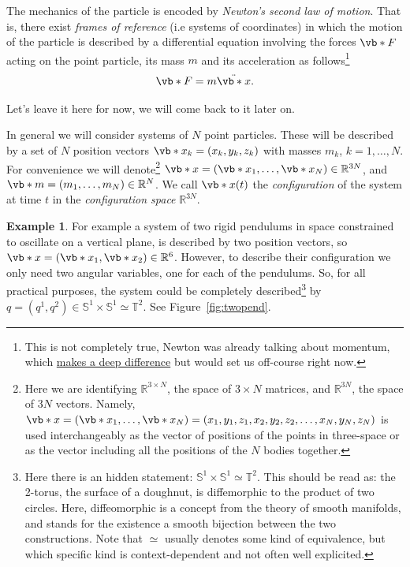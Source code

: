 \documentclass[english,fontsize=11pt,paper=b5]{scrbook}
\theoremstyle{definition}
\newtheorem{example}{Example}[chapter]
\begin{document}
  \begin{tcolorbox}
    The mechanics of the particle is encoded by \emph{Newton's second law of motion}.
    That is, there exist \emph{frames of reference} (i.e systems of coordinates) in which the motion of the particle is described by a differential equation involving the forces $\vb*{F}$ acting on the point particle, its mass $m$ and its acceleration as follows\footnote{This is not completely true, Newton was already talking about momentum, which \href{https://web.archive.org/web/20211201082909/https://bigthink.com/starts-with-a-bang/most-important-equation-physics/}{makes a deep difference} but would set us off-course right now.}
    \begin{equation}\label{eq:newton}
      \vb* F = m \ddot{\vb*{x}}.
    \end{equation}
  \end{tcolorbox}
  Let's leave it here for now, we will come back to it later on.
  \medskip

  In general we will consider systems of $N$ point particles.
  These will be described by a set of $N$ position vectors $\vb*{x}_k = (x_k, y_k ,z_k)$ with masses $m_k$, $k = 1, \ldots, N$.
  For convenience we will denote\footnote{Here we are identifying $\mathbb{R}^{3\times N}$, the space of $3\times N$ matrices, and $\mathbb{R}^{3N}$, the space of $3N$ vectors. Namely, $\vb*{x} = (\vb*{x}_1, \ldots, \vb*{x}_N) = (x_1, y_1, z_1, x_2, y_2, z_2, \ldots, x_N, y_N, z_N)$ is used interchangeably as the vector of positions of the points in three-space or as the vector including all the positions of the $N$ bodies together.} $\vb*{x} = (\vb*{x}_1, \ldots, \vb*{x}_N)\in\mathbb{R}^{3N}$, and $\vb*{m} = (m_1, \ldots, m_N)\in\mathbb{R}^N$.
  We call $\vb*{x}(t)$ the \emph{configuration} of the system at time $t$ in the \emph{configuration space} $\mathbb{R}^{3N}$.

  \begin{example}\label{example:gcoords}
    For example a system of two rigid pendulums in space constrained to oscillate on a vertical plane, is described by two position vectors, so $\vb*{x} = (\vb*{x}_1, \vb*{x}_2)\in\mathbb{R}^{6}$.
    However, to describe their configuration we only need two angular variables, one for each of the pendulums. So, for all practical purposes, the system could be completely described\footnote{Here there is an hidden statement: $\mathbb{S}^1\times\mathbb{S}^1 \simeq \mathbb{T}^2$. This should be read as: the 2-torus, the surface of a doughnut, is diffemorphic to the product of two circles. Here, diffeomorphic is a concept from the theory of smooth manifolds, and stands for the existence a smooth bijection between the two constructions. Note that $\simeq$ usually denotes some kind of equivalence, but which specific kind is context-dependent and not often well explicited.} by $q = (q^1, q^2) \in \mathbb{S}^1\times\mathbb{S}^1 \simeq \mathbb{T}^2$. See Figure~\ref{fig:twopend}.
  \end{example}
\end{document}
